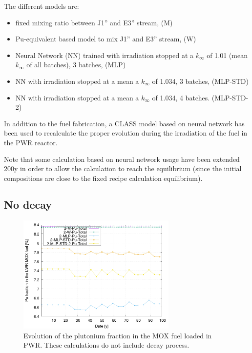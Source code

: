 \documentclass[12pt]{article}
\begin{document}
The different models are:
\begin{itemize}
  \item fixed mixing ratio between J1'' and E3'' stream, (M)
  \item	Pu-equivalent based model to mix J1'' and E3'' stream, (W)
  \item	Neural Network (NN) trained with irradiation stopped at a $k_{\infty}$ of 1.01 (mean $k_{\infty}$ of all batches), 3 batches, (MLP)
  \item	NN with irradiation stopped at a mean a $k_{\infty}$ of 1.034, 3 batches, (MLP-STD)
  \item	NN with irradiation stopped at a mean a $k_{\infty}$ of 1.034, 4 batches. (MLP-STD-2)
\end{itemize}

In addition to the fuel fabrication, a CLASS model based on neural network has
been used to recalculate the proper evolution during the irradiation of the fuel
in the PWR reactor.

Note that some calculation based on neural network usage have been extended 200y
in order to allow the calculation to reach the equilibrium (since the initial
compositions are close to the fixed recipe calculation equilibrium).

\subsection{No decay}

\begin{figure}[h!]
  \centering
  \includegraphics[width=0.7\textwidth]  {img/C_1_2_MOX_pu_contribution}
  \caption{Evolution of the plutonium fraction in the MOX fuel loaded in PWR.
  These calculations do not include decay process.}
  \label{fig:pufrac_ND}
\end{figure}
\end{document}
